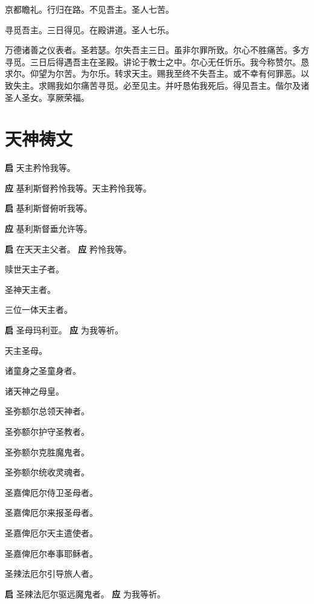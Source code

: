 \documentclass[UTF8,17pt]{ctexart}
\begin{document}
京都瞻礼。⾏归在路。不见吾主。圣⼈七苦。

寻觅吾主。三⽇得见。在殿讲道。圣⼈七乐。

万德诸善之仪表者。圣若瑟。尔失吾主三⽇。虽⾮尔罪所致。尔⼼不胜痛苦。多⽅寻觅。三日后得遇吾主在圣殿。讲论于教⼠之中。尔⼼⽆任忻乐。我今称赞尔。恳求尔。仰望为尔苦。为尔乐。转求天主。赐我⾄终不失吾主。或不幸有何罪恶。以致失主。求赐我如尔痛苦寻觅。必⾄见主。并吁恳佑我死后。得见吾主。偕尔及诸圣⼈圣⼥。享厥荣福。

\section{天神祷文}

\textbf{启} \quad 天主矜怜我等。

\textbf{应} \quad 基利斯督矜怜我等。天主矜怜我等。

\textbf{启} \quad 基利斯督俯听我等。

\textbf{应} \quad 基利斯督垂允许等。

\textbf{启} \quad 在天天主⽗者。 \hfill \textbf{应} \quad 矜怜我等。

 赎世天主⼦者。

 圣神天主者。

 三位⼀体天主者。

\textbf{启} \quad 圣母玛利亚。 \hfill \textbf{应} \quad 为我等祈。

 天主圣母。

 诸童⾝之圣童⾝者。

 诸天神之母皇。

 圣弥额尔总领天神者。

 圣弥额尔护守圣教者。

 圣弥额尔克胜魔⿁者。

 圣弥额尔统收灵魂者。

 圣嘉俾厄尔侍卫圣母者。

 圣嘉俾厄尔来报圣母者。

 圣嘉俾厄尔天主遣使者。

 圣嘉俾厄尔奉事耶稣者。

 圣辣法厄尔引导旅⼈者。

\textbf{启} \quad 圣辣法厄尔驱远魔⿁者。 \hfill \textbf{应} \quad 为我等祈。
\end{document}
